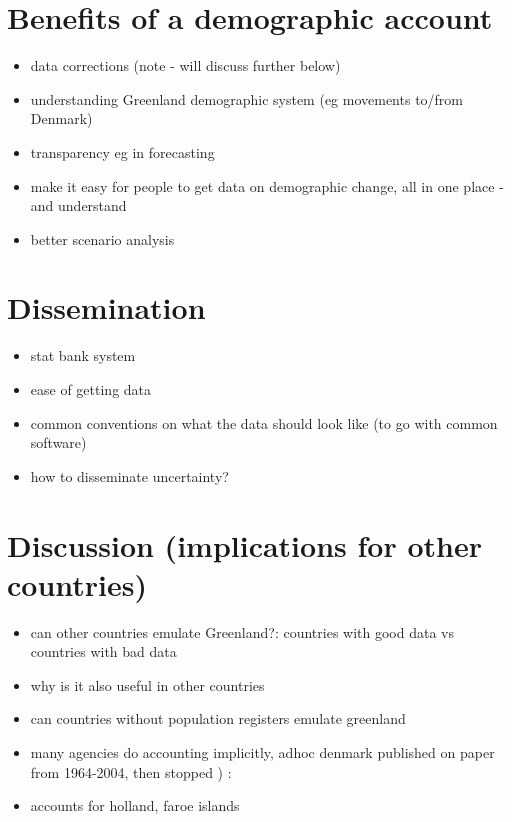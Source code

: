 \documentclass[USenglish]{article}
\begin{document}
\section{Benefits of a demographic account}

\begin{itemize}
    \item data corrections (note - will discuss further below)
    \item understanding Greenland demographic system (eg movements to/from Denmark)
    \item transparency eg in forecasting
    \item make it easy for people to get data on demographic change, all in one place - and understand
    \item better scenario analysis
\end{itemize}



\section{Dissemination}

\begin{itemize}
    \item stat bank system
    \item ease of getting data
    \item common conventions on what the data should look like (to go with common software)
    \item how to disseminate uncertainty?
\end{itemize}

\section{Discussion (implications for other countries)}

\begin{itemize}
    \item can other countries emulate Greenland?: countries with good data vs countries with bad data
    \item why is it also useful in other countries
    \item can countries without population registers emulate greenland
    \item many agencies do accounting implicitly, adhoc
    denmark published on paper from 1964-2004, then stopped ) :
    \item accounts for holland, faroe islands
    
\end{itemize}
\end{document}
